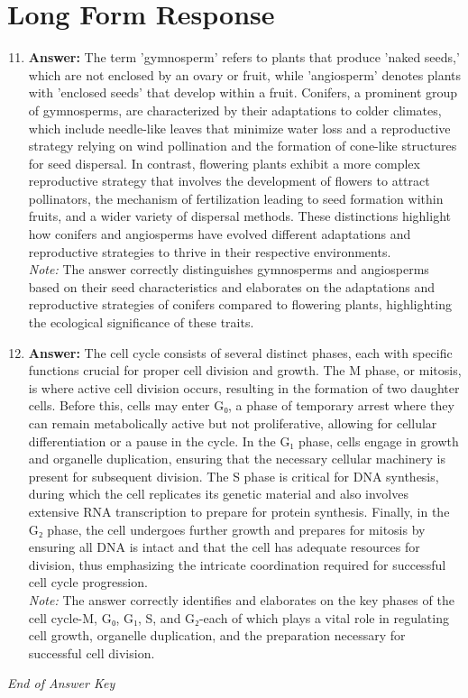 \documentclass[12pt]{article}
\begin{document}
\section*{Long Form Response}
\begin{enumerate}[label=\arabic*.]
\setcounter{enumi}{10}
\item \textbf{Answer:} The term 'gymnosperm' refers to plants that produce 'naked seeds,' which are not enclosed by an ovary or fruit, while 'angiosperm' denotes plants with 'enclosed seeds' that develop within a fruit. Conifers, a prominent group of gymnosperms, are characterized by their adaptations to colder climates, which include needle-like leaves that minimize water loss and a reproductive strategy relying on wind pollination and the formation of cone-like structures for seed dispersal. In contrast, flowering plants exhibit a more complex reproductive strategy that involves the development of flowers to attract pollinators, the mechanism of fertilization leading to seed formation within fruits, and a wider variety of dispersal methods. These distinctions highlight how conifers and angiosperms have evolved different adaptations and reproductive strategies to thrive in their respective environments.
\\ \textit{Note:} The answer correctly distinguishes gymnosperms and angiosperms based on their seed characteristics and elaborates on the adaptations and reproductive strategies of conifers compared to flowering plants, highlighting the ecological significance of these traits.
\item \textbf{Answer:} The cell cycle consists of several distinct phases, each with specific functions crucial for proper cell division and growth. The M phase, or mitosis, is where active cell division occurs, resulting in the formation of two daughter cells. Before this, cells may enter G₀, a phase of temporary arrest where they can remain metabolically active but not proliferative, allowing for cellular differentiation or a pause in the cycle. In the G₁ phase, cells engage in growth and organelle duplication, ensuring that the necessary cellular machinery is present for subsequent division. The S phase is critical for DNA synthesis, during which the cell replicates its genetic material and also involves extensive RNA transcription to prepare for protein synthesis. Finally, in the G₂ phase, the cell undergoes further growth and prepares for mitosis by ensuring all DNA is intact and that the cell has adequate resources for division, thus emphasizing the intricate coordination required for successful cell cycle progression.
\\ \textit{Note:} The answer correctly identifies and elaborates on the key phases of the cell cycle-M, G₀, G₁, S, and G₂-each of which plays a vital role in regulating cell growth, organelle duplication, and the preparation necessary for successful cell division.
\end{enumerate}

\vfill
\noindent\textit{End of Answer Key}
\end{document}
